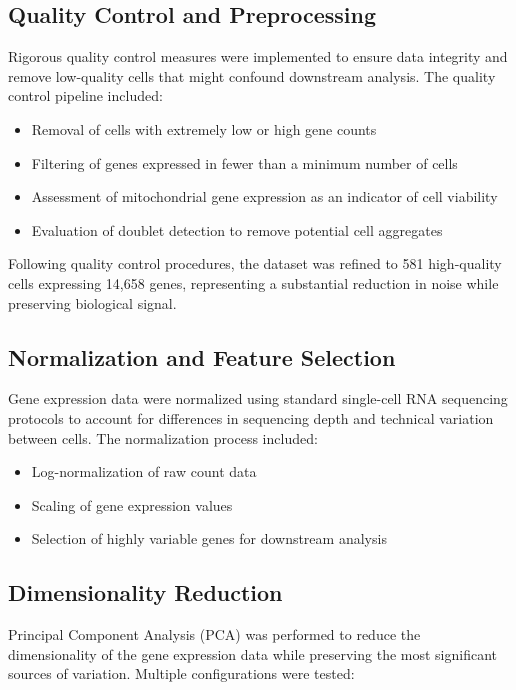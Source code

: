 \documentclass[12pt,a4paper]{article}
\begin{document}
\subsection{Quality Control and Preprocessing}

Rigorous quality control measures were implemented to ensure data integrity and remove low-quality cells that might confound downstream analysis. The quality control pipeline included:

\begin{itemize}
\item Removal of cells with extremely low or high gene counts
\item Filtering of genes expressed in fewer than a minimum number of cells
\item Assessment of mitochondrial gene expression as an indicator of cell viability
\item Evaluation of doublet detection to remove potential cell aggregates
\end{itemize}

Following quality control procedures, the dataset was refined to 581 high-quality cells expressing 14,658 genes, representing a substantial reduction in noise while preserving biological signal.

\subsection{Normalization and Feature Selection}

Gene expression data were normalized using standard single-cell RNA sequencing protocols to account for differences in sequencing depth and technical variation between cells. The normalization process included:

\begin{itemize}
\item Log-normalization of raw count data
\item Scaling of gene expression values
\item Selection of highly variable genes for downstream analysis
\end{itemize}

\subsection{Dimensionality Reduction}

Principal Component Analysis (PCA) was performed to reduce the dimensionality of the gene expression data while preserving the most significant sources of variation. Multiple configurations were tested:
\end{document}
